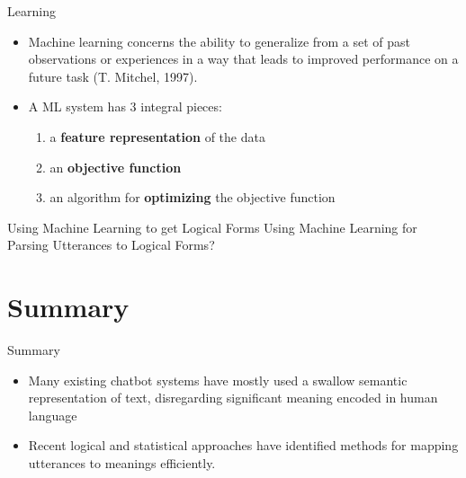 \documentclass{beamer}
\begin{document}
\begin{frame}{Learning}
    \begin{itemize}
        \item Machine learning concerns the ability to generalize from a set of past
observations or experiences in a way that leads to improved
performance on a future task (T. Mitchel, 1997).
        \item A ML system has 3 integral pieces:
        \begin{enumerate}
            \item a \textbf{feature representation} of the data
            \item an \textbf{objective function}
            \item an algorithm for \textbf{optimizing} the objective function
        \end{enumerate}
    \end{itemize}
\end{frame}

\begin{frame}{Using Machine Learning to get Logical Forms}
    Using Machine Learning for Parsing Utterances to Logical Forms?
    
\end{frame}


\section*{Summary}

\begin{frame}{Summary}
  \begin{itemize}
  \item
    Many existing chatbot systems have mostly used a swallow semantic
representation of text, disregarding significant meaning encoded in
human language
  \item
    Recent logical and statistical approaches have identified methods for
mapping utterances to meanings efficiently.
  \end{itemize}
  
  \end{frame}



\appendix
\end{document}
